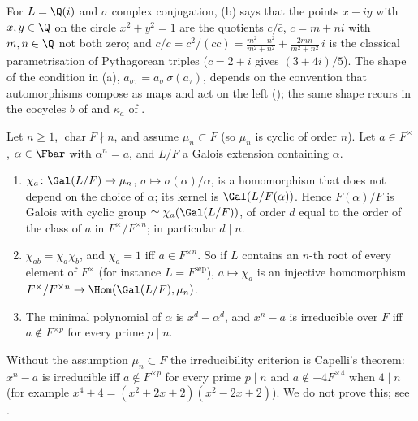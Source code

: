 For $L=\Q(i)$ and $\sigma$ complex conjugation, (b) says that the points $x+iy$ with $x,y\in\Q$ on the circle $x^2+y^2=1$ are the quotients $c/\bar c$, $c=m+ni$
with $m,n\in\Q$ not both zero; and $c/\bar c=c^2/(c\bar c)=\frac{m^2-n^2}{m^2+n^2}+\frac{2mn}{m^2+n^2}\,i$ is the classical parametrisation of Pythagorean triples
($c=2+i$ gives $(3+4i)/5$). The shape of the condition in (a), $a_{\sigma\tau}=a_\sigma\,\sigma(a_\tau)$, depends on the convention that automorphisms compose as
maps and act on the left (); the same shape recurs in the cocycles $b$ of  and $\kappa_a$ of
.

\begin{proposition}\label{prop:galois:kummer-character}
Let $n\ge1$, $\operatorname{char}F\nmid n$, and assume $\mu_n\subset F$ (so $\mu_n$ is cyclic of order $n$). Let $a\in F^\times$, $\alpha\in\Fbar$ with
$\alpha^n=a$, and $L/F$ a Galois extension containing $\alpha$.
\begin{enumerate}[label=(\alph*)]
\item $\chi_a\colon\Gal(L/F)\to\mu_n$, $\sigma\mapsto\sigma(\alpha)/\alpha$, is a homomorphism that does not depend on the choice of $\alpha$; its kernel is
$\Gal(L/F(\alpha))$. Hence $F(\alpha)/F$ is Galois with cyclic group $\simeq\chi_a(\Gal(L/F))$, of order $d$ equal to the order of the class of $a$ in
$F^\times/F^{\times n}$; in particular $d\mid n$.
\item $\chi_{ab}=\chi_a\chi_b$, and $\chi_a=1$ iff $a\in F^{\times n}$. So if $L$ contains an $n$-th root of every element of $F^\times$ (for instance
$L=F^{\mathrm{sep}}$), $a\mapsto\chi_a$ is an injective homomorphism $F^\times/F^{\times n}\to\Hom(\Gal(L/F),\mu_n)$.
\item The minimal polynomial of $\alpha$ is $x^d-\alpha^d$, and $x^n-a$ is irreducible over $F$ iff $a\notin F^{\times p}$ for every prime $p\mid n$.
\end{enumerate}
Without the assumption $\mu_n\subset F$ the irreducibility criterion is Capelli's theorem: $x^n-a$ is irreducible iff $a\notin F^{\times p}$ for every prime
$p\mid n$ and $a\notin-4F^{\times4}$ when $4\mid n$ (for example $x^4+4=(x^2+2x+2)(x^2-2x+2)$). We do not prove this; see \cite[Chapter VI, Theorem 9.1]{Lang}.
\end{proposition}

